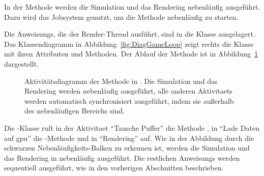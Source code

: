 In der Methode  werden die Simulation und das Rendering nebenläufig ausgeführt. Dazu wird das Jobsystem genutzt, um die Methode  nebenläufig zu starten. 

Die \glspl{Anweisung}, die der Render-Thread ausführt, sind in die Klasse  ausgelagert. Das Klassendiagramm in Abbildung~\ref{fig:DiagGameLoop} zeigt rechts die Klasse  mit ihren Attributen und Methoden. Der Ablauf der Methode  ist in Abbildung~\ref{fig:stepWindowActivity} dargestellt.
\begin{figure}
	\centering
	
	\caption[Aktivitätsdiagramm der Methode  in .]{Aktivitätsdiagramm der Methode  in . Die Simulation und das Rendering werden nebenläufig ausgeführt, alle anderen \glspl{Aktivitaet} werden automatisch synchronisiert ausgeführt, indem sie außerhalb des nebenläufigen Bereichs sind.}\label{fig:stepWindowActivity}
\end{figure}
Die -Klasse ruft in der \gls{Aktivitaet} \enquote{Tausche Puffer} die Methode , in \enquote{Lade Daten auf \ac{gpu}} die -Methode und in \enquote{Rendering}  auf. Wie in der Abbildung durch die schwarzen Nebenläufigkeits-Balken zu erkennen ist, werden die Simulation und das Rendering in  nebenläufig ausgeführt. Die restlichen \glspl{Anweisung} werden sequentiell ausgeführt, wie in den vorherigen Abschnitten beschrieben.